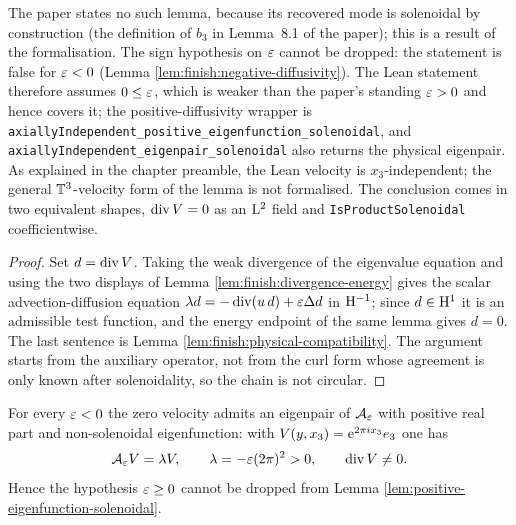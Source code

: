 The paper states no such lemma, because its recovered mode is solenoidal by construction
(the definition of $b_3$ in Lemma~8.1 of the paper); this is a result of the
formalisation.  The sign hypothesis on $\varepsilon$ cannot be dropped: the statement is false for
$\varepsilon<0$ (Lemma \ref{lem:finish:negative-diffusivity}).  The Lean statement therefore assumes
$0\leq\varepsilon$, which is weaker than the paper's standing $\varepsilon>0$ and hence covers it; the
positive-diffusivity wrapper is
\texttt{axiallyIndependent\_positive\_eigenfunction\_solenoidal}, and
\texttt{axiallyIndependent\_eigenpair\_solenoidal} also returns the physical eigenpair.  As explained in the
chapter preamble, the Lean velocity is $x_3$-independent; the general $\mathbb{T}^3$-velocity form of the
lemma is not formalised.  The conclusion comes in two equivalent shapes, $\operatorname{div} V=0$ as an
$\mathrm{L}^2$ field and \texttt{IsProductSolenoidal} coefficientwise.

\begin{proof}
  \leanok
  Set $d=\operatorname{div} V$.  Taking the weak divergence of the eigenvalue equation and using the two displays
  of Lemma \ref{lem:finish:divergence-energy} gives the scalar advection-diffusion equation
  $\lambda d=-\operatorname{div}(u\,d)+\varepsilon\Delta d$ in $\mathrm{H}^{-1}$; since $d\in\mathrm{H}^1$ it is an admissible test
  function, and the energy endpoint of the same lemma gives $d=0$.  The last sentence is Lemma
  \ref{lem:finish:physical-compatibility}.  The argument starts from the auxiliary operator, not
  from the curl form whose agreement is only known after solenoidality, so the chain is not
  circular.
\end{proof}

\begin{lemma}
  \label{lem:finish:negative-diffusivity}
  \leanok
  For every $\varepsilon<0$ the zero velocity admits an eigenpair of $\mathcal{A}_\varepsilon$ with positive real
  part and non-solenoidal eigenfunction: with $V(y,x_3)=\mathrm{e}^{2\pi ix_3}e_3$ one has
  \[
    \mathcal{A}_\varepsilon V=\lambda V,
    \qquad\lambda=-\varepsilon(2\pi)^2>0,
    \qquad\operatorname{div} V\neq0 .
  \]
  Hence the hypothesis $\varepsilon\geq0$ cannot be dropped from Lemma
  \ref{lem:positive-eigenfunction-solenoidal}.
\end{lemma}

